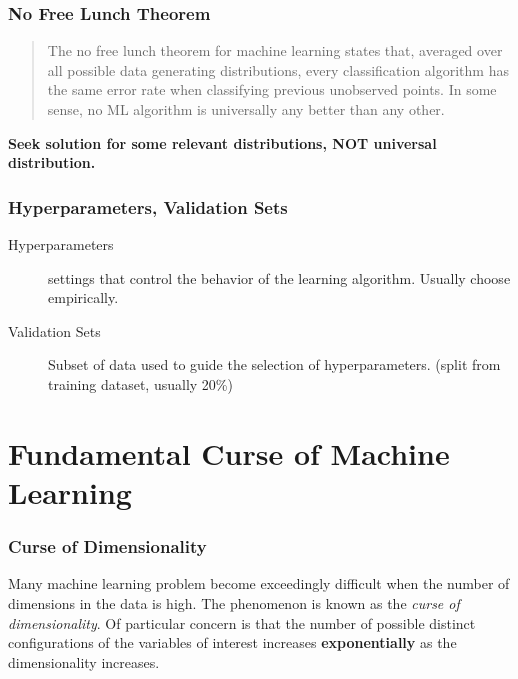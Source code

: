 \documentclass{beamer}
\begin{document}
\begin{frame}
  \frametitle{No Free Lunch Theorem}

  \begin{quote}
    The no free lunch theorem for machine learning \cite{Wolpert:1996} states that, averaged over all possible data generating distributions, every classification algorithm has the same error rate when classifying previous unobserved points. In some sense, no ML algorithm is universally any better than any other.
  \end{quote}

  \centering
  \textbf{Seek solution for some relevant distributions, NOT universal distribution.}
\end{frame}

\begin{frame}
  \frametitle{Hyperparameters, Validation Sets}

  \begin{description}
    \item[Hyperparameters] settings that control the behavior of the learning algorithm. Usually choose empirically.
      \item[Validation Sets] Subset of data used to guide the selection of hyperparameters. (split from training dataset, usually 20\%)
  \end{description}
\end{frame}

\section{Fundamental Curse of Machine Learning}

\begin{frame}
  \frametitle{Curse of Dimensionality}
  
  Many machine learning problem become exceedingly difficult when the number of dimensions in the data is high. The phenomenon is known as the \emph{curse of dimensionality}. Of particular concern is that the number of possible distinct configurations of the variables of interest increases \textbf{exponentially} as the dimensionality increases.
\end{frame}
\end{document}
